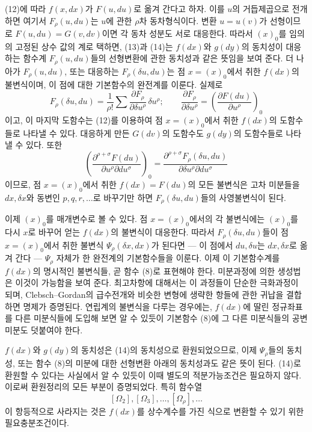(12)에 따라 \(f(x,dx)\)가 \(F(u,du)\)로 옮겨 간다고 하자. 이를 \(u\)의 거듭제곱으로 전개하면
여기서 \(F_\rho(u,du)\)는 \(u\)에 관한 \(\rho\)차 동차형식이다. 변환 \(u=u(v)\)가 선형이므로 \(F(u,du)=G(v,dv)\)이면 각 동차 성분도 서로 대응한다.
따라서 \((x)_0\)를 임의의 고정된 상수 값의 계로 택하면, (13)과 (14)는 \(f(dx)\)와 \(g(dy)\)의 동치성이 대응하는 함수계 \(F_\rho(u,du)\)들의 선형변환에 관한 동치성과 같은 뜻임을 보여 준다. 더 나아가 \(F_\rho(u,du)\), 또는 대응하는 \(F_\rho(\delta u,du)\)는 점 \(x=(x)_0\)에서 취한 \(f(dx)\)의 불변식이며, 이 점에 대한 기본함수의 완전계를 이룬다. 실제로
\[
F_\rho(\delta u,du)=\frac1{\rho!}\sum
\frac{\partial F_\rho}{\partial \delta u^\rho}\,\delta u^\rho;
\qquad
\frac{\partial F_\rho}{\partial \delta u^\rho}
=\left(\frac{\partial F(du)}{\partial u^\rho}\right)_0
\]
이고, 이 마지막 도함수는 (12)를 이용하여 점 \(x=(x)_0\)에서 취한 \(f(dx)\)의 도함수들로 나타낼 수 있다. 대응하게 만든 \(G(dv)\)의 도함수도 \(g(dy)\)의 도함수들로 나타낼 수 있다. 또한
\[
\left(\frac{\partial^{\rho+\sigma}F(du)}
{\partial u^\rho\partial du^\sigma}\right)_0
=
\frac{\partial^{\rho+\sigma}F_\rho(\delta u,du)}
{\partial\delta u^\rho\partial du^\sigma}
\]
이므로, 점 \(x=(x)_0\)에서 취한 \(f(dx)=F(du)\)의 모든 불변식은 고차 미분들을 \(dx,\delta x\)와 동변인 \(p,q,r,\ldots\)로 바꾸기만 하면 \(F_\rho(\delta u,du)\)들의 사영불변식이 된다.

이제 \((x)_0\)를 매개변수로 볼 수 있다. 점 \(x=(x)_0\)에서의 각 불변식에는 \((x)_0\)를 다시 \(x\)로 바꾸어 얻는 \(f(dx)\)의 불변식이 대응한다. 따라서 \(F_\rho(\delta u,du)\)들이 점 \(x=(x)_0\)에서 취한 불변식 \(\Psi_\rho(\delta x,dx)\)가 된다면 --- 이 점에서 \(du,\delta u\)는 \(dx,\delta x\)로 옮겨 간다 --- \(\Psi_\rho\) 자체가 한 완전계의 기본함수들을 이룬다. 이제 이 기본함수계를 \(f(dx)\)의 명시적인 불변식들, 곧 함수 (8)로 표현해야 한다. 미분과정에 의한 생성법은 이것이 가능함을 보여 준다. 최고차항에 대해서는 이 과정들이 단순한 극화과정이 되며, Clebsch--Gordan의 급수전개와 비슷한 변형에 생략한 항들에 관한 귀납을 결합하면 명제가 증명된다. 연립계의 불변식을 다루는 경우에는, \(f(dx)\)에 딸린 정규좌표를 다른 미분식들에 도입해 보면 알 수 있듯이 기본함수 (8)에 그 다른 미분식들의 공변미분도 덧붙여야 한다.

\(f(dx)\)와 \(g(dy)\)의 동치성은 (14)의 동치성으로 환원되었으므로, 이제 \(\Psi_\rho\)들의 동치성, 또는 함수 (8)의 미분에 대한 선형변환 아래의 동치성과도 같은 뜻이 된다. (14)로 환원할 수 있다는 사실에서 알 수 있듯이 이때 별도의 적분가능조건은 필요하지 않다. 이로써 환원정리의 모든 부분이 증명되었다. 특히 함수열
\[
[\Omega_2],[\Omega_3],\ldots,[\Omega_\rho],\ldots
\]
이 항등적으로 사라지는 것은 \(f(dx)\)를 상수계수를 가진 식으로 변환할 수 있기 위한 필요충분조건이다.

